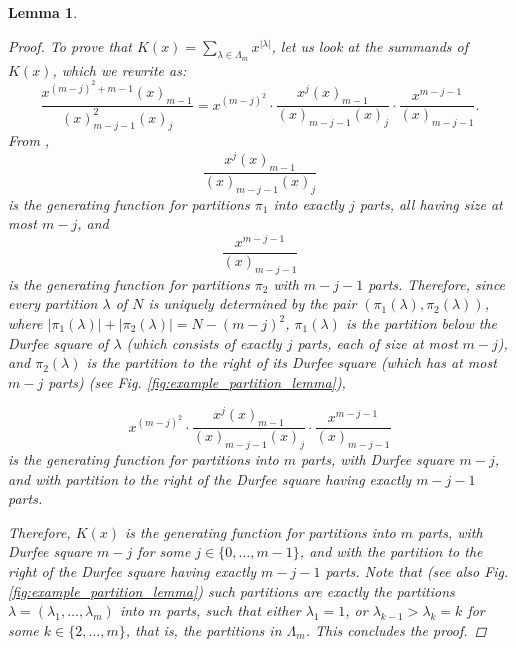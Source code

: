 \documentclass[a4paper, 12pt, oneside]{amsart}
\newtheorem{lemma}[prop]{Lemma}
\theoremstyle{definition}
\begin{document}
\begin{lemma}
\begin{proof}
To prove that $K(x)=\sum_{\lambda \in \Lambda_m}x^{|\lambda|}$, let us look at the summands of $K(x)$, which we rewrite as:
$$\frac{x^{(m-j)^2+m-1}(x)_{m-1}}{(x)_{m-j-1}^2(x)_j}=x^{(m-j)^2}\cdot \frac{x^j(x)_{m-1}}{(x)_{m-j-1}(x)_j}\cdot\frac{x^{m-j-1}}{(x)_{m-j-1}}.$$
From \cite[Theorem~3.1]{Andrews},
$$\frac{x^j(x)_{m-1}}{(x)_{m-j-1}(x)_j}$$
is the generating function for partitions $\pi_1$ into exactly $j$ parts, all having size at most $m-j$, and 
$$\frac{x^{m-j-1}}{(x)_{m-j-1}}$$
is the generating function for partitions $\pi_2$ with $m-j-1$ parts.
Therefore, since every partition $\lambda$ of $N$ is uniquely determined by the pair $(\pi_1(\lambda),\pi_2(\lambda))$, where $|\pi_1(\lambda)|+|\pi_2(\lambda)|=N-(m-j)^2$, $\pi_1(\lambda)$ is the partition below the Durfee square of $\lambda$ (which consists of exactly 
$j$ parts, each of size at most $m-j$), and $\pi_2(\lambda)$ is the partition to the right of its Durfee square (which has at most $m-j$ parts) (see Fig. \ref{fig:example_partition_lemma}),

$$x^{(m-j)^2}\cdot \frac{x^j(x)_{m-1}}{(x)_{m-j-1}(x)_j}\cdot\frac{x^{m-j-1}}{(x)_{m-j-1}}$$
is the generating function for partitions into $m$ parts, with Durfee square $m-j$, and with partition to the right of the Durfee square having exactly $m-j-1$ parts.

Therefore, $K(x)$ is the generating function for  partitions into $m$ parts, with Durfee square $m-j$ for some $j \in \{0,\dots,m-1\}$, and with the partition to the right of the Durfee square having exactly $m-j-1$ parts. Note that (see also Fig. \ref{fig:example_partition_lemma}) such partitions are exactly the partitions $\lambda=(\lambda_1,\dots,\lambda_m)$ into $m$ parts, such that either $\lambda_1=1$, or $\lambda_{k-1}>\lambda_k=k$ for some  $k \in \{2,\dots,m\}$, that is, the partitions in $\Lambda_m$. This concludes the proof.
\end{proof}
 \end{lemma}
\end{document}
